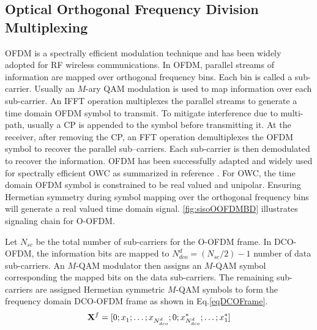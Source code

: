 \subsection{Optical Orthogonal Frequency Division Multiplexing}
\label{subsec:sisoModulationOOFDM}
OFDM is a spectrally efficient modulation technique and has been widely adopted for RF wireless communications. In OFDM, parallel streams of information are mapped over orthogonal frequency bins. Each bin is called a sub-carrier. Usually an $M$-ary QAM modulation is used to map information over each sub-carrier. An IFFT operation multiplexes the parallel streams to generate a time domain OFDM symbol to transmit. To mitigate interference due to multi-path, usually a CP is appended to the symbol before transmitting it. At the receiver, after removing the CP, an FFT operation demultiplexes the OFDM symbol to recover the parallel sub--carriers. Each sub-carrier is then demodulated to recover the information. OFDM has been successfully adapted and widely used for spectrally efficient OWC as summarized in reference \cite{arm09a}. For OWC, the time domain OFDM symbol is constrained to be real valued and unipolar. Ensuring Hermetian symmetry during symbol mapping over the orthogonal frequency bins will generate a real valued time domain signal. \figurename{ \ref{fig:sisoOOFDMBD}} illustrates signaling chain for O-OFDM. 


Let $N_{sc}$ be the total number of sub-carriers for the O-OFDM frame. In DCO-OFDM,  the information bits are mapped to $N_{dco}^{d} = (N_{sc}/2) - 1$ number of data sub-carriers. An $M$-QAM modulator then assigns an $M$-QAM symbol corresponding the mapped bits on the data sub-carriers. The remaining sub-carriers are assigned Hermetian symmetric $M$-QAM symbols to form the frequency domain DCO-OFDM frame as shown in Eq.\eqref{eqDCOFrame}. 
\begin{equation}
	{\bf{X}}^{f} = [0; x_{1}^{ }; \ldots; x_{N_{dco}^{d}}^{ }; 0; x_{N_{dco}^{d}}^{*}; \ldots; x_{1}^{*}]
\label{eqDCOFrame}
\end{equation}


